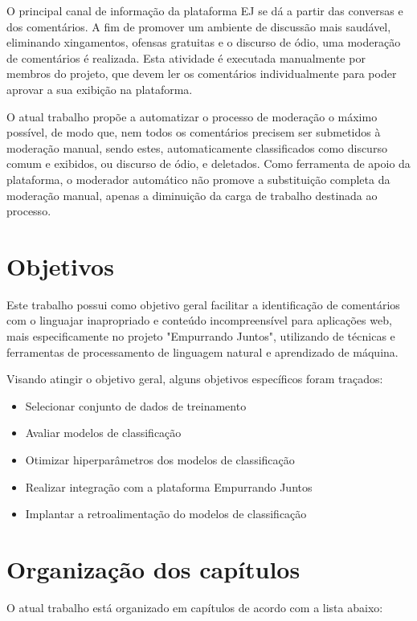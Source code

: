 O principal canal de informação da plataforma EJ se dá a partir das conversas e dos comentários. A fim de promover um ambiente de discussão mais saudável, eliminando xingamentos, ofensas gratuitas e o discurso de ódio, uma moderação de comentários é realizada. Esta atividade é executada manualmente por membros do projeto, que devem ler os comentários individualmente para poder aprovar a sua exibição na plataforma.

O atual trabalho propõe a automatizar o processo de moderação o máximo possível, de modo que, nem todos os comentários precisem ser submetidos à moderação manual, sendo estes, automaticamente classificados como discurso comum e exibidos, ou discurso de ódio, e deletados. Como ferramenta de apoio da plataforma, o moderador automático não promove a substituição completa da moderação manual, apenas a diminuição da carga de trabalho destinada ao processo.

\section[Objetivos]{Objetivos}

Este trabalho possui como objetivo geral facilitar a identificação de comentários com o linguajar inapropriado e conteúdo incompreensível para aplicações web, mais especificamente no projeto "Empurrando Juntos", utilizando de técnicas e ferramentas de processamento de linguagem natural e aprendizado de máquina.

Visando atingir o objetivo geral, alguns objetivos específicos foram traçados:

\begin{itemize}
\item Selecionar conjunto de dados de treinamento
\item Avaliar modelos de classificação
\item Otimizar hiperparâmetros dos modelos de classificação
\item Realizar integração com a plataforma Empurrando Juntos
\item Implantar a retroalimentação do modelos de classificação
\end{itemize}

\section[Organização dos capítulos]{Organização dos capítulos}

O atual trabalho está organizado em capítulos de acordo com a lista abaixo:

